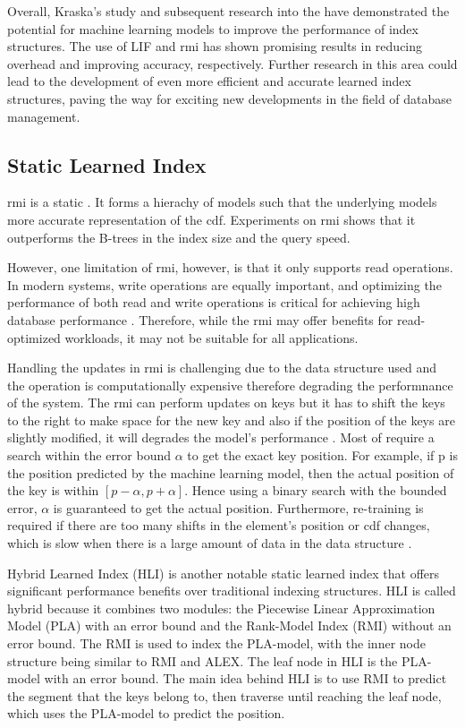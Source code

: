 Overall, Kraska's study and subsequent research into the \learnindex have demonstrated the potential for machine learning models to improve the performance of index structures. The use of LIF and \acrshort{rmi} has shown promising results in reducing overhead and improving accuracy, respectively. Further research in this area could lead to the development of even more efficient and accurate learned index structures, paving the way for exciting new developments in the field of database management.

\subsection{Static Learned Index}
\acrshort{rmi} is a static \learnindex. It forms a hierachy of models such that the underlying models more accurate representation of the \acrshort{cdf}. Experiments on \acrshort{rmi} shows that it outperforms the B-trees in the index size and the query speed. 

However, one limitation of \acrshort{rmi}, however, is that it only supports read operations. In modern systems, write operations are equally important, and optimizing the performance of both read and write operations is critical for achieving high database performance \cite{lourencco2015no}. Therefore, while the \acrshort{rmi} may offer benefits for read-optimized workloads, it may not be suitable for all applications.

Handling the updates in \acrshort{rmi} is challenging due to the data structure used and the operation is computationally expensive therefore degrading the performnance of the system. The \acrshort{rmi} can perform updates on keys but it has to shift the keys to the right to make space for the new key and also if the position of the keys are slightly modified, it will degrades the model's performance \cite{handlingupdates}. Most of \learnindex require a search within the error bound $\alpha$ to get the exact key position. For example, if \textsf{p} is the position predicted by the machine learning model, then the actual position of the key is within $[p-\alpha,p+\alpha]$. Hence using a binary search with the bounded error, $\alpha$ is guaranteed to get the actual position. Furthermore, re-training is required if there are too many shifts in the element's position or \acrshort{cdf} changes, which is slow when there is a large amount of data in the data structure \cite{ALEX}. 

Hybrid Learned Index (HLI) is another notable static learned index that offers significant performance benefits over traditional indexing structures. HLI is called hybrid because it combines two modules: the Piecewise Linear Approximation Model (PLA) with an error bound and the Rank-Model Index (RMI) without an error bound. The RMI is used to index the PLA-model, with the inner node structure being similar to RMI and ALEX. The leaf node in HLI is the PLA-model with an error bound. The main idea behind HLI is to use RMI to predict the segment that the keys belong to, then traverse until reaching the leaf node, which uses the PLA-model to predict the position.

